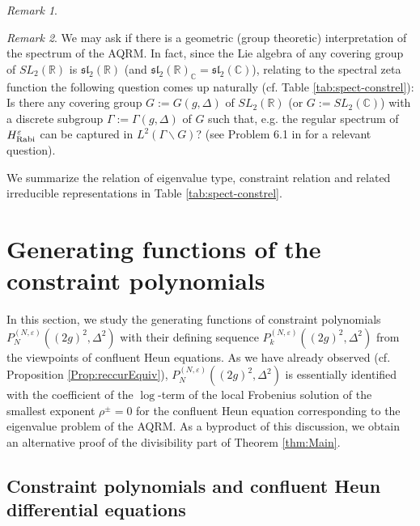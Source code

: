\documentclass[11pt]{article}
\numberwithin{equation}{section}
\newcommand{\R}{\mathbb{R}} %
\newcommand{\C}{\mathbb{C}} %
\newcommand{\e}{\varepsilon}
\newcommand{\HRabi}[1]{H_{\text{\upshape Rabi}}^{#1}} %
\theoremstyle{plain}
\theoremstyle{definition}
\theoremstyle{remark}
\newtheorem{rem}{Remark}[section]
\begin{document}
\begin{rem}
\end{rem}

\begin{rem}
  We may ask if there is a geometric (group theoretic) interpretation of the spectrum of the AQRM. In fact, since the Lie algebra of any
  covering group of $SL_2(\R)$ is $\mathfrak{sl}_2(\R)$ (and $\mathfrak{sl}_2(\R)_\C=\mathfrak{sl}_2(\C)$), relating to the spectral zeta function
  the following question comes up naturally (cf. Table \ref{tab:spect-constrel}): Is there any covering group $G:=G(g,\Delta)$ of $SL_2(\R)$ (or
  $G:=SL_2(\C)$) with a discrete subgroup $\Gamma:=\Gamma(g,\Delta)$ of $G$ such that, e.g. the regular spectrum of $\HRabi{\e}$ can be captured in
  $L^2(\Gamma\backslash G)$?  (see Problem  6.1 in \cite{W2016JPA} for a relevant question).
\end{rem}

  
    We summarize the relation of eigenvalue type, constraint relation and related irreducible representations in Table \ref{tab:spect-constrel}.

\section{Generating functions of the constraint polynomials}\label{sec:further}

In this section, we study the generating functions of constraint polynomials $P_N^{(N,\e)}((2g)^2,\Delta^2)$ with their defining
sequence $P_k^{(N,\e)}((2g)^2,\Delta^2)$ from the viewpoints of confluent Heun equations. As we have already observed (cf. Proposition
\ref{Prop:reccurEquiv}), $P_N^{(N,\e)}((2g)^2,\Delta^2)$ is essentially identified with the coefficient of the $\log$-term of the local Frobenius
solution of the smallest exponent $ \rho^{\pm}= 0$ for the confluent Heun equation corresponding to the eigenvalue problem of the AQRM. As a byproduct of
this discussion, we obtain an alternative proof of the divisibility part of Theorem \ref{thm:Main}. %

\subsection{Constraint polynomials and confluent Heun differential equations} \label{sec:div}
\end{document}
